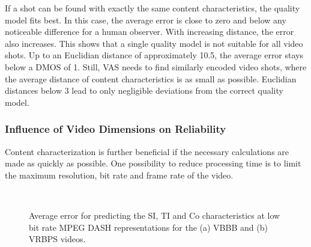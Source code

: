 If a shot can be found with exactly the same content characteristics, the quality model fits best. 
In this case, the average error is close to zero and below any noticeable difference for a human observer.
With increasing distance, the error also increases. 
This shows that a single quality model is not suitable for all video shots. 
Up to an Euclidian distance of approximately 10.5, the average error stays below a \ac{DMOS} of 1. 
Still, \ac{VAS} needs to find similarly encoded video shots, where the average distance of content characteristics is as small as possible.
Euclidian distances below 3 lead to only negligible deviations from the correct quality model.
\subsubsection{Influence of Video Dimensions on Reliability}
Content characterization is further beneficial if the necessary calculations are made as quickly as possible.
One possibility to reduce processing time is to limit the maximum resolution, bit rate and frame rate of the video. 
\begin{figure}[!tbh]
\centering
{}\\
\caption[Average error for calculating the \ac{SI}, \ac{TI} and \ac{Co} characteristics]{Average error for predicting the \ac{SI}, \ac{TI} and \ac{Co} characteristics at low bit rate \ac{MPEG} \ac{DASH} representations for the (a) VBBB and (b) VRBPS videos.}
\label{fig:sitierrorvbbb}
\end{figure}


